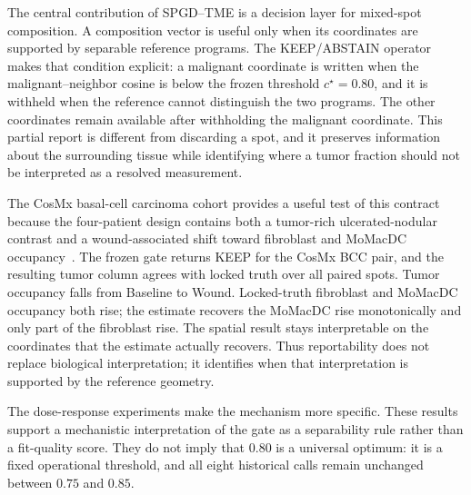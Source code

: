 The central contribution of SPGD--TME is a decision layer for mixed-spot composition. A composition vector is useful only when its coordinates are supported by separable reference programs. The KEEP/ABSTAIN operator makes that condition explicit: a malignant coordinate is written when the malignant--neighbor cosine is below the frozen threshold \(c^\star=0.80\), and it is withheld when the reference cannot distinguish the two programs. The other coordinates remain available after withholding the malignant coordinate. This partial report is different from discarding a spot, and it preserves information about the surrounding tissue while identifying where a tumor fraction should not be interpreted as a resolved measurement.

The CosMx basal-cell carcinoma cohort provides a useful test of this contract because the four-patient design contains both a tumor-rich ulcerated-nodular contrast and a wound-associated shift toward fibroblast and MoMacDC occupancy~\citep{Andreatta2024zenodo,Yerly2022,Yerly2025preprint,Dvorak1986}. The frozen gate returns KEEP for the CosMx BCC pair, and the resulting tumor column agrees with locked truth over all paired spots. Tumor occupancy falls from Baseline to Wound. Locked-truth fibroblast and MoMacDC occupancy both rise; the estimate recovers the MoMacDC rise monotonically and only part of the fibroblast rise. The spatial result stays interpretable on the coordinates that the estimate actually recovers. Thus reportability does not replace biological interpretation; it identifies when that interpretation is supported by the reference geometry.

The dose-response experiments make the mechanism more specific. These results support a mechanistic interpretation of the gate as a separability rule rather than a fit-quality score. They do not imply that \(0.80\) is a universal optimum: it is a fixed operational threshold, and all eight historical calls remain unchanged between \(0.75\) and \(0.85\).

